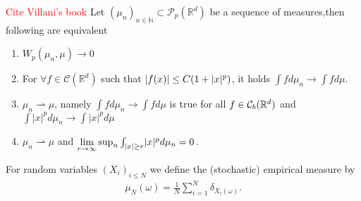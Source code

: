 \begin{lemma} \textcolor{red}{Cite Villani's book}
  Let $(\mu_n)_{n \in  \mathbb{N}} \subset  \mathcal{P}_p(\mathbb{R}^{d} )$ be a sequence of measures,then following are equivalent
  \begin{enumerate}
   \item $W_p(\mu_n,\mu ) \to 0$
    \item  For $\forall f \in \mathcal{C}(\mathbb{R}^{d} )$ such that $\lvert f(x)\rvert \le  C(1+\lvert x\rvert^{p} )$, it holds
     $\int  f d\mu_n \to \int  f d\mu $.
    \item $\mu_n \rightharpoonup \mu $, namely $ \int  f d\mu_n \to \int  f d\mu $ is true for all $f\in\mathcal{C}_b(\mathbb{R}^d)$ and  $ \int  |x|^p d\mu_n \to \int  |x|^p d\mu $
    \item $\mu_n \rightharpoonup \mu $ and $\lim_{r\to \infty} \sup_n \int_{\abs{x} \ge r} \abs{x}^p d\mu_n = 0$.
  \end{enumerate} 
\end{lemma}

\begin{definition}\label{empirical_stochastic}
	For random variables $(X_i)_{i\le N}$  we define the (stochastic) empirical measure by
	\begin{align*}
	\mu_N(\omega ) = \frac{1}{N}\sum_{i=1}^{N} \delta_{X_i(\omega)} 
	.\end{align*}
\end{definition}


